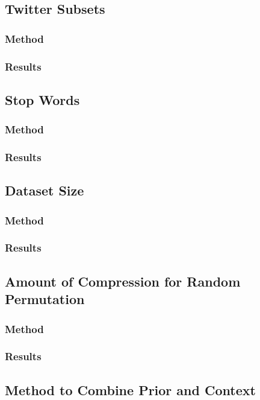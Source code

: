 \documentclass[man,floatsintext,donotrepeattitle]{apa6}
\begin{document}
\subsection{Twitter Subsets}

\subsubsection{Method}
\subsubsection{Results}

\subsection{Stop Words}

\subsubsection{Method}
\subsubsection{Results}

\subsection{Dataset Size}

\subsubsection{Method}
\subsubsection{Results}

\subsection{Amount of Compression for Random Permutation}

\subsubsection{Method}
\subsubsection{Results}

\subsection{Method to Combine Prior and Context}
\end{document}
